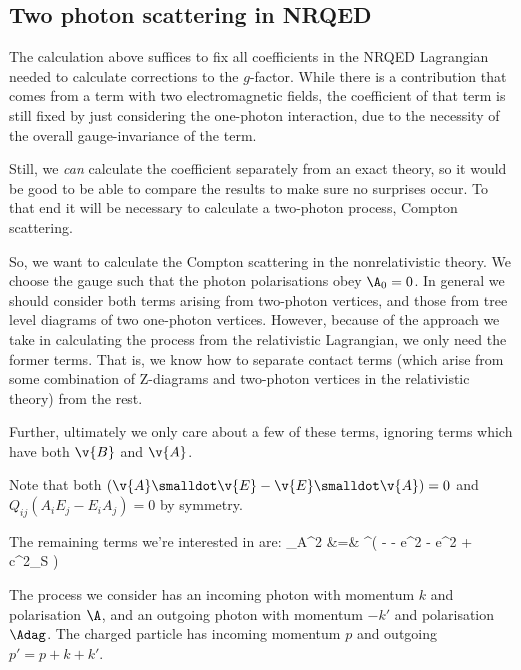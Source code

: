 
\subsection{Two photon scattering in NRQED}
The calculation above suffices to fix all coefficients in the NRQED Lagrangian needed to calculate corrections to the $g$-factor.  While there is a contribution that comes from a term with two electromagnetic fields, the coefficient of that term is still fixed by just considering the one-photon interaction, due to the necessity of the overall gauge-invariance of the term.

Still, we {\it can} calculate the coefficient separately from an exact theory, so it would be good to be able to compare the results to make sure no surprises occur.  To that end it will be necessary to calculate a two-photon process, Compton scattering.


So, we want to calculate the Compton scattering in the nonrelativistic theory.  We choose the gauge such that the photon polarisations obey $\A_0 = 0$.  In general we should consider both terms arising from two-photon vertices, and those from tree level diagrams of two one-photon vertices.  However, because of the approach we take in calculating the process from the relativistic Lagrangian, we only need the former terms.  That is, we know how to separate contact terms (which arise from some combination of Z-diagrams and two-photon vertices in the relativistic theory) from the rest.

Further, ultimately we only care about a few of these terms, ignoring terms which have both $\v{B}$ and $\v{A}$.

Note that both $(\v{A} \smalldot \v{E} - \v{E} \smalldot \v{A} )=0$ and $Q_{ij} (A_i E_j - E_i A_j) = 0$ by symmetry.

The remaining terms we're interested in are:
\scriptsize
\beqa
	_{A^2} &=& \Psi^\dagger ( -   - e^2  - e^2
		+ c^2_S  ) \Psi
\eeqa
\normalsize

The process we consider has an incoming photon with momentum $k$ and polarisation $\A$, and an outgoing photon with momentum $-k'$ and polarisation $\Adag$.  The charged particle has incoming momentum $p$ and outgoing $p'= p + k + k'$.

